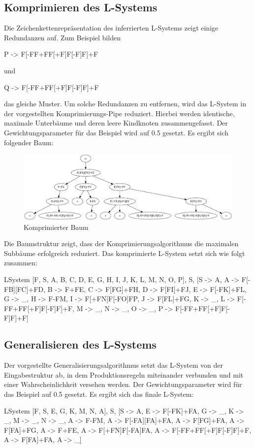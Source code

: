 \subsection*{Komprimieren des L-Systems}
Die Zeichenkettenrepräsentation des inferrierten L-Systems zeigt einige Redundanzen auf.
Zum Beispiel bilden
\begin{csource}
    P -> F[-FF+FF[+F]F[-F]F]+F
\end{csource}
und
\begin{csource}
    Q -> F[-FF+FF[+F]F[-F]F]+F
\end{csource}
das gleiche Muster.
Um solche Redundanzen zu entfernen, wird das L-System in der vorgestellten Komprimierungs-Pipe reduziert.
Hierbei werden identische, maximale Unterbäume und deren leere Kindknoten zusammengefasst.
Der Gewichtungsparameter für das Beispiel wird auf 0.5 gesetzt.
Es ergibt sich folgender Baum:
\begin{figure}[H]
    \centering
    \includegraphics[width=14cm]{../images/compressed_tree.png}
    \caption{Komprimierter Baum}
\end{figure}

Die Baumstruktur zeigt, dass der Komprimierungsalgorithmus die maximalen Subbäume erfolgreich reduziert.
Das komprimierte L-System setzt sich wie folgt zusammen:
\begin{csource}
LSystem{
    [F, S, A, B, C, D, E, G, H, I, J, K, L, M, N, O, P],
    S,
    [S -> A, A -> F[-FB][FC]+FD, B -> F+FE, C -> F[FG]+FH, D -> F[FI]+FJ, E -> F[-FK]+FL, G -> _, H -> F-FM, I -> F[+FN]F[-FO]FP, J -> F[FL]+FG, K -> _, L -> F[-FF+FF[+F]F[-F]F]+F, M -> _, N -> _, O -> _, P -> F[-FF+FF[+F]F[-F]F]+F]
}
\end{csource}

\subsection*{Generalisieren des L-Systems}
Der vorgestellte Generalisierungsalgorithmus setzt das L-System von der Eingabestruktur ab, in dem
Produktionsregeln miteinander verbunden und mit einer Wahrscheinlichkeit versehen werden.
Der Gewichtungsparameter wird für das Beispiel auf 0.5 gesetzt.
Es ergibt sich das finale L-System:
\begin{csource}
LSystem{
    [F, S, E, G, K, M, N, A],
    S,
    [S -> A, E -> F[-FK]+FA, G -> _, K -> _, M -> _, N -> _, A -> F-FM, A -> F[-FA][FA]+FA, A -> F[FG]+FA, A -> F[FA]+FG, A -> F+FE, A -> F[+FN]F[-FA]FA, A -> F[-FF+FF[+F]F[-F]F]+F, A -> F[FA]+FA, A -> _]
}
\end{csource}

